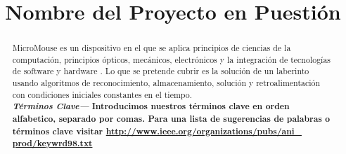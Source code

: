 \documentclass[conference]{IEEEtran} %
\providecommand{\keywords}[1]{\textbf{\textit{Términos Clave---}} #1}
\begin{document}

\title{Nombre del Proyecto en Puestión}

\author{
	\and
	\and
	\and
	\and
	}




\maketitle


\begin{abstract}
MicroMouse es un dispositivo en el que se aplica principios de ciencias de la computación, principios ópticos, mecánicos, electrónicos y la integración de tecnologías de software y hardware  . Lo que se pretende cubrir es la solución de un laberinto usando algoritmos de reconocimiento, almacenamiento, solución y retroalimentación con condiciones iniciales constantes en el tiempo.\\

\keywords{\textbf{Introducimos nuestros términos clave en orden alfabetico, separado por comas. Para una lista de sugerencias de palabras o términos clave visitar \underline{http://www.ieee.org/organizations/pubs/ani\_ prod/keywrd98.txt}}}
\end{abstract}
\end{document}
